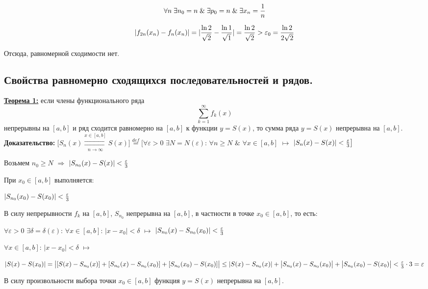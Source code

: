 \documentclass[a4paper,12pt]{article} %
\begin{document}
$$\forall n \; \exists n_0 = n \; \& \; \exists p_0 = n \; \& \; \exists x_n = {1 \over n}$$

$$|f_{2n}(x_n) - f_n(x_n)| = |{\ln{2}\over{\sqrt{2}}} - {\ln{1}\over{\sqrt{1}}}| = {\ln{2}\over{\sqrt{2}}} > \varepsilon_0 = {\ln{2}\over{2\sqrt{2}}}$$

Отсюда, равномерной сходимости нет.


\subsection{Свойства равномерно сходящихся последовательностей и рядов.}

\underline{\textbf{Теорема 1:}} если члены функционального ряда $$\sum\limits_{k = 1}^{\infty}  f_k(x)$$   непрерывны на $[a,b]$ и ряд сходится равномерно на $[a,b]$ к функции $y = S(x)$, то сумма ряда 
$y = S(x)$ непрерывна на $[a,b]$. \\

\textbf{Доказательство:} \newline
$\big[S_n(x) \overset{x \in [a,b]}{\underset{n \rightarrow \infty}{\rightrightarrows}} S(x)\big]\stackrel{def}{=} \big[ \forall \varepsilon > 0 $  $\exists N = N(\varepsilon)$: $\forall n \geq N$  $\&$  $\forall x \in [a,b]$ $\longmapsto$ $|S_n(x) -S(x)| < {\varepsilon \over 3} \big]$

Возьмем $n_0 \geq N$ $\Rightarrow$ $|S_{n_0}(x)-S(x)| < {\varepsilon \over 3}$

При $x_0 \in [a,b]$ выполняется:

$|S_{n_0}(x_0)-S(x_0)| < {\varepsilon \over 3}$

В силу непрерывности $f_k$ на $[a,b]$, $S_{n_0}$ непрерывна на $[a,b]$, в частности в точке $x_0 \in [a,b]$, то есть:

$\forall \varepsilon > 0$ $\exists \delta = \delta(\varepsilon)$: $\forall x \in [a,b]$:  $|x-x_0|<\delta$ $\longmapsto$ $|S_{n_0}(x) - S_{n_0}(x_0)| < {\varepsilon \over 3}$

$\forall x \in [a,b]$: $|x-x_0|<\delta$ $\longmapsto$ 
\newline

$|S(x) - S(x_0)| = \big| [S(x)-S_{n_0}(x)] + [S_{n_0}(x)-S_{n_0}(x_0)] + [S_{n_0}(x_0)-S(x_0)]\big| \leq |S(x)-S_{n_0}(x)| + \big| S_{n_0}(x)-S_{n_0}(x_0)\big| + \big|S_{n_0}(x_0) - S(x_0)\big| < {\varepsilon \over 3} \cdot 3 = \varepsilon$

 В силу произвольности выбора точки $x_0 \in [a,b]$ функция $y = S(x)$ непрерывна на $[a,b]$.\\
\end{document}
